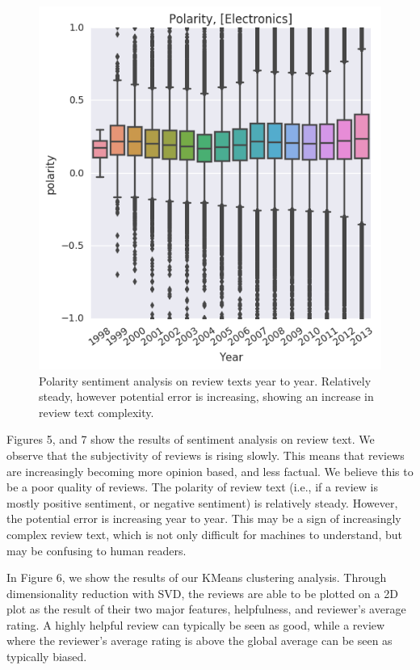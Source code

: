 \documentclass[journal, a4paper]{IEEEtran}
\begin{document}
\begin{figure}[!hbt]
    \begin{center}
    \includegraphics[width=\columnwidth]{polarity.png}
    \caption{Polarity sentiment analysis on review texts year to year. Relatively steady, however potential error is increasing, showing an increase in review text complexity.}
    \end{center}
\end{figure}

Figures 5, and 7 show the results of sentiment analysis on review text. We observe that the subjectivity of reviews is rising slowly. This means that reviews are increasingly becoming more opinion based, and less factual. We believe this to be a poor quality of reviews. The polarity of review text (i.e., if a review is mostly positive sentiment, or negative sentiment) is relatively steady. However, the potential error is increasing year to year. This may be a sign of increasingly complex review text, which is not only difficult for machines to understand, but may be confusing to human readers.


In Figure 6, we show the results of our KMeans clustering analysis. Through dimensionality reduction with SVD, the reviews are able to be plotted on a 2D plot as the result of their two major features, helpfulness, and reviewer's average rating. A highly helpful review can typically be seen as good, while a review where the reviewer's average rating is above the global average can be seen as typically biased.
\end{document}
